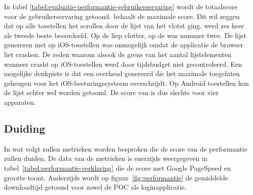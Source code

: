 In tabel \ref{tabel:evaluatie-performantie-gebruikerservaring} wordt de totaalscore voor de gebruikerservaring getoond.
\st{} behaalt de maximale score.
Dit wil zeggen dat op alle toestellen het scrollen door de lijst van \st{} het vlotst ging.
\jqm{} werd zes keer als tweede beste beoordeeld. 
Op de \htc{} liep \kendo{} vlotter,  op de \ipadi{} was \lungo{} nummer twee.
De lijst genereren met \kendo{} op iOS-toestellen was onmogelijk omdat de applicatie de browser liet crashen.
De reden waarom alsook de grens van het aantal lijstelementen wanneer \kendo{} crasht op iOS-toestellen werd door tijdsbudget niet gecontroleerd.
Een mogelijke denkpiste is dat \kendo{} een overhead genereerd die het maximale toegelaten geheugen voor het iOS-besturingssysteem overschrijdt.
Op Android toestellen kon de \kendo{} lijst echter wel worden getoond.
De score van \kendo{} is dus slechts voor vier apparaten.


\subsection{Duiding}
\label{sec:evaluatie-performantie-duiding}

In wat volgt zullen metrieken worden besproken die de score van de performantie zullen duiden.
De data van de metrieken is enerzijds weergegeven in tabel~\ref{tabel:performantie-verklaring} die de score met Google PageSpeed en grootte toont.
Anderzijds wordt op figuur~\ref{fig:performantie} de gemiddelde downloadtijd getoond voor zowel de POC als loginapplicatie.

\begin{table}
\centering
{}
\caption{Duiding bij performantie van de loginapplicatie.}
\label{tabel:performantie-verklaring}
\end{table}


